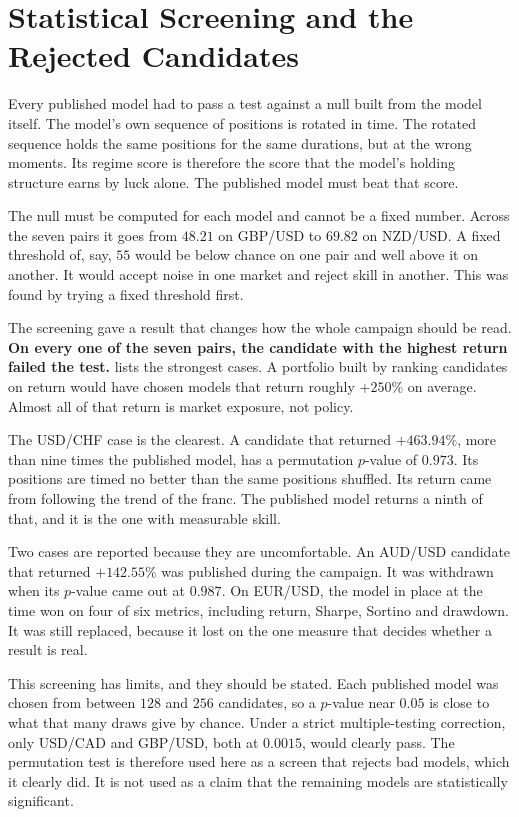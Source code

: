 \section{Statistical Screening and the Rejected Candidates}
\label{Section:StatisticalScreening}

Every published model had to pass a test against a null built from the model itself. The model's own sequence of positions is rotated in time. The rotated sequence holds the same positions for the same durations, but at the wrong moments. Its regime score is therefore the score that the model's holding structure earns by luck alone. The published model must beat that score.

The null must be computed for each model and cannot be a fixed number. Across the seven pairs it goes from $48.21$ on GBP/USD to $69.82$ on NZD/USD. A fixed threshold of, say, $55$ would be below chance on one pair and well above it on another. It would accept noise in one market and reject skill in another. This was found by trying a fixed threshold first.

The screening gave a result that changes how the whole campaign should be read. \textbf{On every one of the seven pairs, the candidate with the highest return failed the test.}  lists the strongest cases. A portfolio built by ranking candidates on return would have chosen models that return roughly $+250\%$ on average. Almost all of that return is market exposure, not policy.



The USD/CHF case is the clearest. A candidate that returned $+463.94\%$, more than nine times the published model, has a permutation $p$-value of $0.973$. Its positions are timed no better than the same positions shuffled. Its return came from following the trend of the franc. The published model returns a ninth of that, and it is the one with measurable skill.

Two cases are reported because they are uncomfortable. An AUD/USD candidate that returned $+142.55\%$ was published during the campaign. It was withdrawn when its $p$-value came out at $0.987$. On EUR/USD, the model in place at the time won on four of six metrics, including return, Sharpe, Sortino and drawdown. It was still replaced, because it lost on the one measure that decides whether a result is real.

This screening has limits, and they should be stated. Each published model was chosen from between $128$ and $256$ candidates, so a $p$-value near $0.05$ is close to what that many draws give by chance. Under a strict multiple-testing correction, only USD/CAD and GBP/USD, both at $0.0015$, would clearly pass. The permutation test is therefore used here as a screen that rejects bad models, which it clearly did. It is not used as a claim that the remaining models are statistically significant.